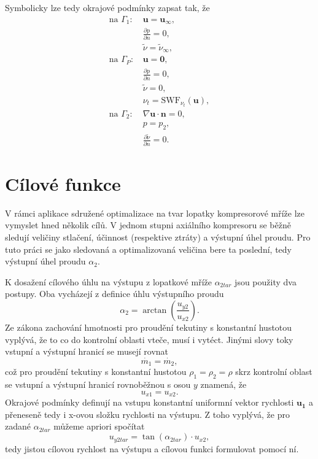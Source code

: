 Symbolicky lze tedy okrajové podmínky zapsat tak, že
\begin{align*}
\text{na }\Gamma_1:\,& \mathbf{u}=\mathbf{u}_\infty, \\
				   & \frac{\partial p}{\partial n}=0, \\
				   & \widetilde{\nu}=\widetilde{\nu}_\infty,\\
\text{na }\Gamma_P:\,& \mathbf{u}=\mathbf{0}, \\
				   & \frac{\partial p}{\partial n}=0, \\
				   & \widetilde{\nu}=0, \\
				   & \nu_t=\mathrm{SWF}_{\nu_t}(\mathbf{u}), \\
\text{na }\Gamma_2:\,& \nabla \mathbf{u} \cdot \mathbf{n}=0,\\
				   & p=p_2, \\
				   & \frac{\partial \widetilde{\nu}}{\partial n}=0.
\end{align*}

\section{Cílové funkce}

V rámci aplikace sdružené optimalizace na tvar lopatky kompresorové mříže lze vymyslet hned několik cílů. V jednom stupni axiálního kompresoru se běžně sledují veličiny stlačení, účinnost (respektive ztráty) a výstupní úhel proudu. Pro tuto práci se jako sledovaná a optimalizovaná veličina bere ta poslední, tedy výstupní úhel proudu $ \alpha_2 $. 

K dosažení cílového úhlu na výstupu z lopatkové mříže $ \alpha_{2tar} $ jsou použity dva postupy. Oba vycházejí z definice úhlu výstupního proudu
\begin{equation}\label{eq:alpha_tan}
\alpha_2 = \arctan\left(\dfrac{u_{y2}}{u_{x2}}\right).
\end{equation}
Ze zákona zachování hmotnosti pro proudění tekutiny s konstantní hustotou vyplývá, že to co do kontrolní oblasti vteče, musí i vytéct. Jinými slovy toky vstupní a výstupní hranicí se musejí rovnat
\begin{equation}
\dot{m_1}=\dot{m_2},
\end{equation}
což pro proudění tekutiny s konstantní hustotou $ \rho_1 = \rho_2 = \rho $ skrz kontrolní oblast se vstupní a výstupní hranicí rovnoběžnou s osou $ y $ znamená, že 
\begin{equation}\label{eq:ux1_ux2}
u_{x1}=u_{x2}.
\end{equation}
Okrajové podmínky definují na vstupu konstantní uniformní vektor rychlosti $ \mathbf{u_1} $ a přeneseně tedy i x-ovou složku rychlosti na výstupu. Z toho vyplývá, že pro zadané $ \alpha_{2tar} $ můžeme apriori spočítat
\begin{equation}
u_{y2tar} = \tan(\alpha_{2tar}) \cdot u_{x2},
\end{equation}
tedy jistou cílovou rychlost na výstupu a cílovou funkci formulovat pomocí ní.

